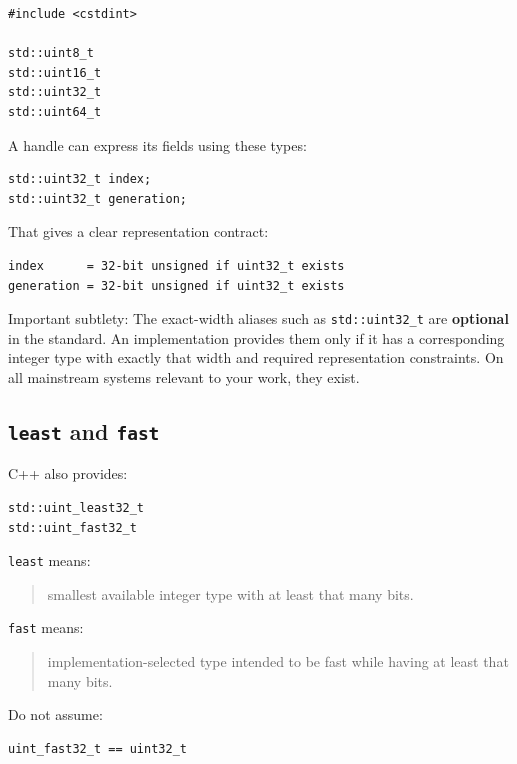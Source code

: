 \begin{verbatim}
#include <cstdint>

std::uint8_t
std::uint16_t
std::uint32_t
std::uint64_t
\end{verbatim}

A handle can express its fields using these types:

\begin{verbatim}
std::uint32_t index;
std::uint32_t generation;
\end{verbatim}

That gives a clear representation contract:

\begin{verbatim}
index      = 32-bit unsigned if uint32_t exists
generation = 32-bit unsigned if uint32_t exists
\end{verbatim}

Important subtlety: The exact-width aliases such as \texttt{std::uint32\_t} are \textbf{optional} in the standard. An implementation provides them only if it has a corresponding integer type with exactly that width and required representation constraints. On all mainstream systems relevant to your work, they exist.

\subsection{\texorpdfstring{\texttt{least} and \texttt{fast}}{least and fast}}\label{05-engine-i-ch002-least-and-fast}

C++ also provides:

\begin{verbatim}
std::uint_least32_t
std::uint_fast32_t
\end{verbatim}

\texttt{least} means:

\begin{quote}
smallest available integer type with at least that many bits.
\end{quote}

\texttt{fast} means:

\begin{quote}
implementation-selected type intended to be fast while having at least that many bits.
\end{quote}

Do not assume:

\begin{verbatim}
uint_fast32_t == uint32_t
\end{verbatim}

